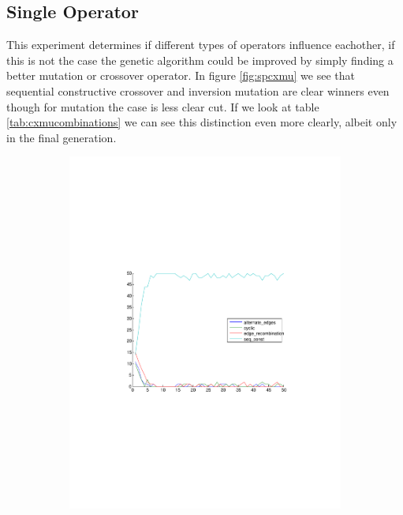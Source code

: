 \documentclass[a4paper]{article}
\begin{document}
\FloatBarrier
\subsection{Single Operator}

This experiment determines if different types of operators influence
eachother, if this is not the case the genetic algorithm could be
improved by simply finding a better mutation or crossover operator.
In figure \ref{fig:spcxmu} we see that sequential constructive crossover
and inversion mutation are clear winners even though for mutation the
case is less clear cut.
If we look at table \ref{tab:cxmucombinations} we can see this
distinction even more clearly, albeit only in the final generation.

\begin{figure}[h]
	\centering
    \begin{subfigure}[h]{0.49\textwidth}
    \includegraphics[width=\textwidth,trim={4cm 8cm 4cm 8cm},clip]{spcx}
    \end{subfigure}

\end{figure}
\end{document}
